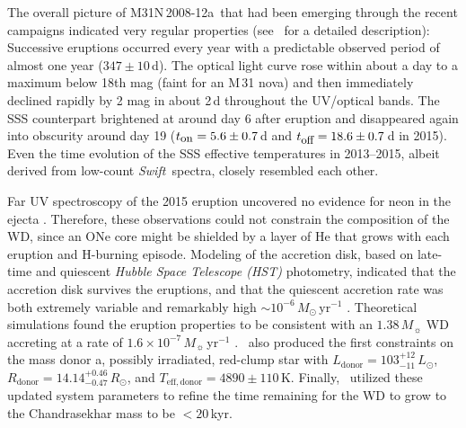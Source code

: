 \documentclass[twocolumn,tighten]{aastex6}
\def\m31{{M\,31}}
\def\swift{{\it Swift~}}
\def\nova{{M31N\,2008-12a~}}
\newcommand{\eton}{t_{\mbox{\small{on}}}}
\newcommand{\etoff}{t_{\mbox{\small{off}}}}
\newcommand{\othreek}{\citetalias{2016ApJ...833..149D}}
\newcommand{\hstspec}{\citetalias{2017ApJ...847...35D}}
\newcommand{\hstphot}{\citetalias{2017ApJ...849...96D}}
\begin{document}
\begin{table*}
\end{table*}

The overall picture of \nova that had been emerging through the recent campaigns indicated very regular properties (see \othreek\ for a detailed description): Successive eruptions occurred every year with a predictable observed period of almost one year ($347\pm10$\,d). The optical light curve rose within about a day to a maximum below 18th mag (faint for an \m31 nova) and then immediately declined rapidly by 2 mag in about 2\,d throughout the UV/optical bands. The SSS counterpart brightened at around day 6 after eruption and disappeared again into obscurity around day 19 ($\eton = 5.6\pm0.7$\,d and $\etoff = 18.6\pm0.7$\,d in 2015). Even the time evolution of the SSS effective temperatures in 2013--2015, albeit derived from low-count \swift spectra, closely resembled each other.

Far UV spectroscopy of the 2015 eruption uncovered no evidence for neon in the ejecta \citep[hereafter \hstspec]{2017ApJ...847...35D}. Therefore, these observations could not constrain the composition of the WD, since an ONe core might be shielded by a layer of He that grows with each eruption and H-burning episode.  Modeling of the accretion disk, based on late-time and quiescent {\it Hubble Space Telescope (HST)} photometry, indicated that the accretion disk survives the eruptions, and that the quiescent accretion rate was both extremely variable and remarkably high $\sim10^{-6}\,M_\odot\,\mathrm{yr}^{-1}$ \citep[hereafter \hstphot]{2017ApJ...849...96D}.  Theoretical simulations found the eruption properties to be consistent with an $1.38\,M_\sun$ WD accreting at a rate of $1.6 \times 10^{-7}\,M_\sun$\,yr$^{-1}$ \citep{2015ApJ...808...52K,2016ApJ...830...40K,2017ApJ...838..153K}. \hstphot\ also produced the first constraints on the mass donor a, possibly irradiated, red-clump star with $L_\mathrm{donor}=103^{+12}_{-11}\,L_\odot$, $R_\mathrm{donor}=14.14^{+0.46}_{-0.47}\,R_\odot$, and $T_\mathrm{eff, donor}=4890\pm110$\,K.  Finally, \hstphot\ utilized these updated system parameters to refine the time remaining for the WD to grow to the Chandrasekhar mass to be $<20$\,kyr. 
\end{document}
